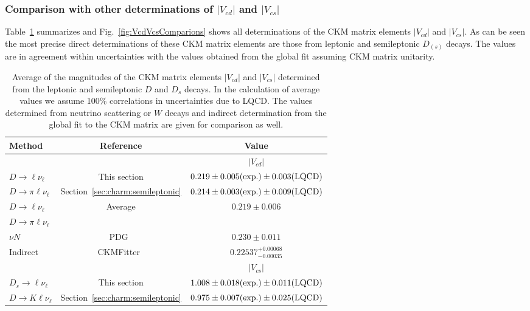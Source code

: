 \subsubsection{Comparison with other determinations of $|V_{cd}|$ and $|V_{cs}|$}

Table~\ref{tab:CKMVcdVcs} summarizes and Fig.~\ref{fig:VcdVcsComparions} shows all determinations of the CKM matrix elements $|V_{cd}|$ and $|V_{cs}|$. As
can be seen the most precise direct determinations of these CKM matrix elements are those from leptonic and semileptonic $D_{(s)}$ decays. The values are in agreement
within uncertainties with the values obtained from the global fit assuming CKM matrix unitarity.
\begin{table}[htb]
\caption{Average of the magnitudes of the CKM matrix elements $|V_{cd}|$ and $|V_{cs}|$ determined from the leptonic and semileptonic $D$ and $D_s$ decays.
In the calculation of average values we assume 100\% correlations in uncertainties due to LQCD.  The values determined from neutrino scattering 
or $W$ decays and indirect determination from the global fit to the CKM matrix are given for comparison as well.
\label{tab:CKMVcdVcs}}
\begin{center}
\begin{tabular}{lcc}
\toprule
\rowcolor{Gray} Method & Reference & Value \\ 
\midrule
&&{$|V_{cd}|$}\\
\cline{3-3}
$D\to\ell\nu_{\ell}$ 	 & This section			& $0.219\pm0.005(\rm exp.)\pm0.003(\rm LQCD)$\\
$D\to\pi\ell\nu_{\ell}$  & Section~\ref{sec:charm:semileptonic}		& $0.214\pm0.003(\rm exp.)\pm0.009(\rm LQCD)$\\
\midrule
\rowcolor{Gray} $D\to\ell\nu_{\ell}$ 	& \multirow{2}{*}{Average}	& \multirow{2}{*}{$0.219\pm0.006$}\\
\rowcolor{Gray} $D\to\pi\ell\nu_{\ell}$ & \multirow{-2}{*}{Average}	& \multirow{-2}{*}{$0.219\pm0.006$}\\
\midrule
$\nu N$			& PDG~\cite{PDG_2012}	& $0.230\pm0.011$\\
Indirect		& CKMFitter~\cite{Charles:2004jd}		& $0.22537^{+0.00068}_{-0.00035}$\\
\midrule
\midrule
&&{$|V_{cs}|$}\\
\cline{3-3}
$D_s\to\ell\nu_{\ell}$ 	 & This section			& $1.008\pm0.018(\rm exp.)\pm0.011(\rm LQCD)$\\
$D\to K\ell\nu_{\ell}$   & Section~\ref{sec:charm:semileptonic}		& $0.975\pm0.007(\rm exp.)\pm0.025(\rm LQCD)$\\

\end{tabular}
\end{center}
\end{table}
